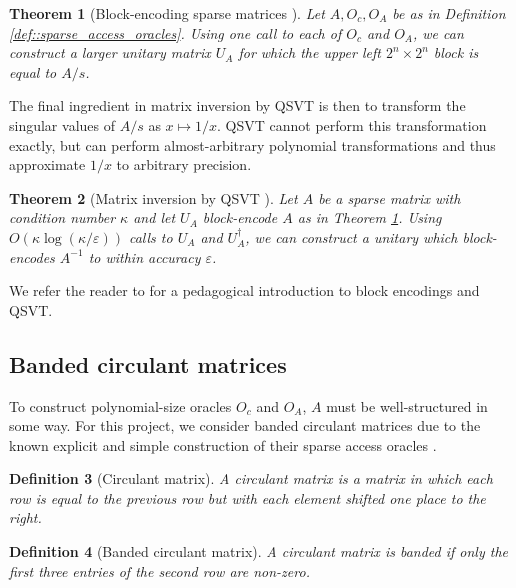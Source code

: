 \documentclass[10pt, twocolumn]{article}
\newtheorem{theorem}{Theorem}[section]
\newtheorem{definition}[theorem]{Definition}
\begin{document}
\begin{theorem}[Block-encoding sparse matrices \cite{gilyen2019quantum, camps2203explicit}]
	\label{thm::block_encoding_sparse_matrices}
	Let $A, O_c, O_A$ be as in Definition \ref{def::sparse_access_oracles}. Using one call to each of $O_c$ and $O_A$, we can construct a larger unitary matrix $U_A$ for which the upper left $2^n \times 2^n$ block is equal to $A/s$.
\end{theorem}

The final ingredient in matrix inversion by QSVT is then to transform the singular values of $A/s$ as $x \mapsto 1/x$. QSVT cannot perform this transformation exactly, but can perform almost-arbitrary polynomial transformations \cite{sunderhauf2023generalized} and thus approximate $1/x$ to arbitrary precision.

\begin{theorem}[Matrix inversion by QSVT \cite{gilyen2019quantum}]
	\label{thm::matrix_inversion_by_qsvt}
	Let $A$ be a sparse matrix with condition number $\kappa$ and let $U_A$ block-encode $A$ as in Theorem \ref{thm::block_encoding_sparse_matrices}. Using $O(\kappa \log(\kappa / \varepsilon))$ calls to $U_A$ and $U_A^\dag$, we can construct a unitary which block-encodes $A^{-1}$ to within accuracy $\varepsilon$.
\end{theorem}

We refer the reader to \cite{martyn2021grand} for a pedagogical introduction to block encodings and QSVT.

\subsection{Banded circulant matrices}

To construct polynomial-size oracles $O_c$ and $O_A$, $A$ must be well-structured in some way. For this project, we consider banded circulant matrices due to the known explicit and simple construction of their sparse access oracles \cite{camps2203explicit}.

\begin{definition}[Circulant matrix]
	A circulant matrix is a matrix in which each row is equal to the previous row but with each element shifted one place to the right.
\end{definition}

\begin{definition}[Banded circulant matrix]
	A circulant matrix is banded if only the first three entries of the second row are non-zero.
\end{definition}
\end{document}

